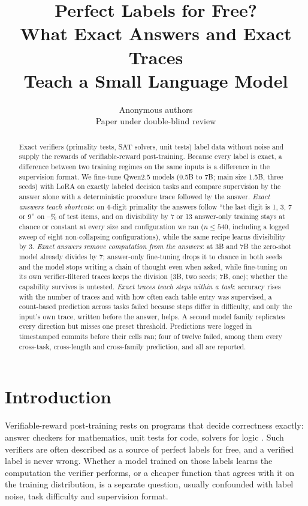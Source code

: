 \documentclass{article}
\title{Perfect Labels for Free?\\ What Exact Answers and Exact Traces\\ Teach a Small Language Model}
\author{Anonymous authors\\ Paper under double-blind review}
\theoremstyle{definition}
\begin{document}
\maketitle

\begin{abstract}
Exact verifiers (primality tests, SAT solvers, unit tests) label data without noise and supply the rewards of verifiable-reward post-training. Because every label is exact, a difference between two training regimes on the same inputs is a difference in the supervision format. We fine-tune Qwen2.5 models (0.5B to 7B; main size 1.5B, three seeds) with LoRA on exactly labeled decision tasks and compare supervision by the answer alone with a deterministic procedure trace followed by the answer. \emph{Exact answers teach shortcuts}: on 4-digit primality the answers follow ``the last digit is 1, 3, 7 or 9'' on \primeAagreeLastDigitLo--\primeAagreeLastDigitHi\% of test items, and on divisibility by 7 or 13 answer-only training stays at chance or constant at every size and configuration we ran ($n\le540$, including a logged sweep of eight non-collapsing configurations), while the same recipe learns divisibility by 3. \emph{Exact answers remove computation from the answers}: at 3B and 7B the zero-shot model already divides by 7; answer-only fine-tuning drops it to chance in both seeds and the model stops writing a chain of thought even when asked, while fine-tuning on its own verifier-filtered traces keeps the division (3B, two seeds; 7B, one); whether the capability survives is untested. \emph{Exact traces teach steps within a task}: accuracy rises with the number of traces and with how often each table entry was supervised, a count-based prediction across tasks failed because steps differ in difficulty, and only the input's own trace, written before the answer, helps. A second model family replicates every direction but misses one preset threshold. Predictions were logged in timestamped commits before their cells ran; four of twelve failed, among them every cross-task, cross-length and cross-family prediction, and all are reported.
\end{abstract}

\section{Introduction}
Verifiable-reward post-training rests on programs that decide correctness exactly: answer checkers for mathematics, unit tests for code, solvers for logic \citep{lambert2024tulu,deepseek2025r1}. Such verifiers are often described as a source of perfect labels for free, and a verified label is never wrong. Whether a model trained on those labels learns the computation the verifier performs, or a cheaper function that agrees with it on the training distribution, is a separate question, usually confounded with label noise, task difficulty and supervision format.
\end{document}
